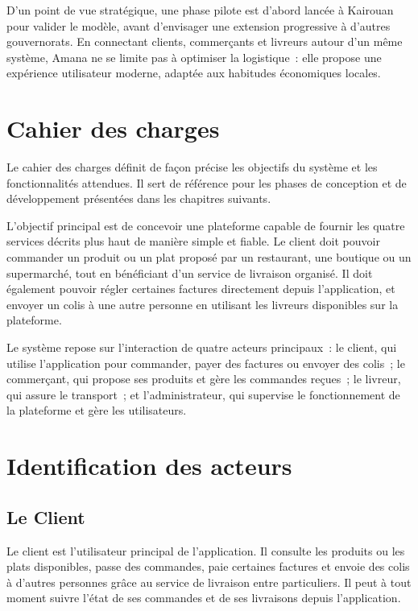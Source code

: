 \documentclass[12pt,fleqn,a4paper]{report}
\begin{document}
\begin{justify}
D'un point de vue stratégique, une phase pilote est d'abord lancée à Kairouan pour valider le modèle, avant d'envisager une extension progressive à d'autres gouvernorats. En connectant clients, commerçants et livreurs autour d'un même système, Amana ne se limite pas à optimiser la logistique~: elle propose une expérience utilisateur moderne, adaptée aux habitudes économiques locales.

\section{Cahier des charges}

Le cahier des charges définit de façon précise les objectifs du système et les fonctionnalités attendues. Il sert de référence pour les phases de conception et de développement présentées dans les chapitres suivants.

L'objectif principal est de concevoir une plateforme capable de fournir les quatre services décrits plus haut de manière simple et fiable. Le client doit pouvoir commander un produit ou un plat proposé par un restaurant, une boutique ou un supermarché, tout en bénéficiant d'un service de livraison organisé. Il doit également pouvoir régler certaines factures directement depuis l'application, et envoyer un colis à une autre personne en utilisant les livreurs disponibles sur la plateforme.

Le système repose sur l'interaction de quatre acteurs principaux~: le client, qui utilise l'application pour commander, payer des factures ou envoyer des colis~; le commerçant, qui propose ses produits et gère les commandes reçues~; le livreur, qui assure le transport~; et l'administrateur, qui supervise le fonctionnement de la plateforme et gère les utilisateurs.

\section{Identification des acteurs}

\subsection{Le Client}
Le client est l'utilisateur principal de l'application. Il consulte les produits ou les plats disponibles, passe des commandes, paie certaines factures et envoie des colis à d'autres personnes grâce au service de livraison entre particuliers. Il peut à tout moment suivre l'état de ses commandes et de ses livraisons depuis l'application.


\end{justify}
\end{document}
